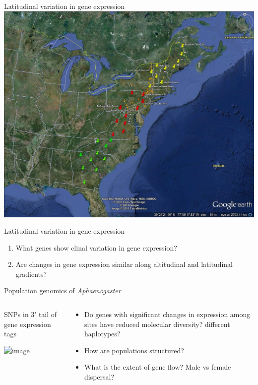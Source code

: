 \documentclass{beamer}
\begin{document}
\begin{frame}{Latitudinal variation in gene expression}
	\includegraphics[width=\textwidth, height=\textheight, keepaspectratio]{Aphaenogaster2013_sampling_locations_20130313.jpg}
\end{frame}


\begin{frame}{Latitudinal variation in gene expression}

	\begin{enumerate}
		\item What genes show clinal variation in gene expression?
		\item Are changes in gene expression similar along altitudinal and latitudinal gradients?
	\end{enumerate}
\end{frame}


\begin{frame}{Population genomics of \textit{Aphaenogaster}}
	\begin{columns}
		\begin{column}{5cm}

			SNPs in 3' tail of gene expression tags
			\vspace{1cm}

			\includegraphics<1>[width=5cm]{ovation_DGE.png}\\
		\end{column}
		\begin{column}{5cm}
			\begin{center}
				\begin{itemize}
					\item Do genes with significant changes in expression among sites have reduced molecular diversity? different haplotypes?
					\item How are populations structured?
					\item What is the extent of gene flow? Male vs female dispersal?
				\end{itemize}
			\end{center}
		\end{column}
	\end{columns}
\end{frame}
\end{document}
